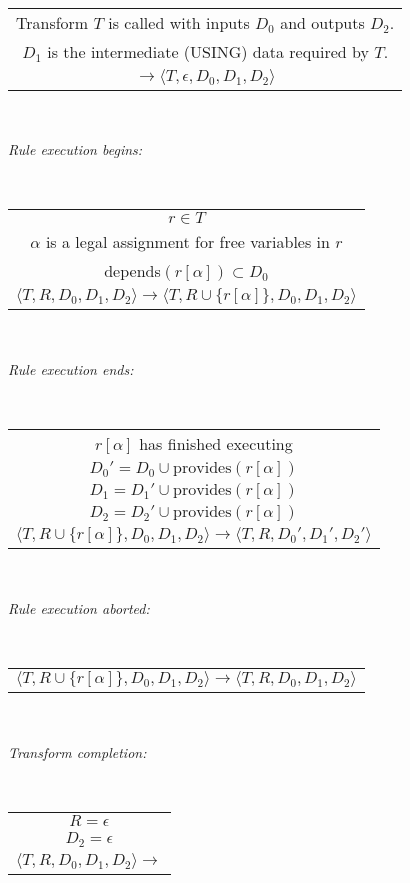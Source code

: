 \documentclass[11pt]{article}
\begin{document}
~

\begin{tabular}{c}
Transform $T$ is called with inputs $D_0$ and outputs $D_2$.
\\
$D_1$ is the intermediate (USING) data required by $T$.
\\\hline
$\rightarrow \langle T, \epsilon, D_0, D_1, D_2 \rangle$ 
\end{tabular}

~

\noindent
{\it
Rule execution begins:}

~

\begin{tabular}{c}
$r \in T$ \\
$\alpha$ is a legal assignment for free variables in $r$ \\
depends$(r[\alpha]) \subset D_0$  
\\\hline
$
\langle T, R, D_0, D_1, D_2 \rangle
\rightarrow
\langle T, R \cup \{r[\alpha]\}, D_0, D_1, D_2 \rangle$ 
\end{tabular}

~

\noindent
{\it
Rule execution ends:}

~

\begin{tabular}{c}
$r[\alpha]$ has finished executing
\\
$D_0' = D_0 \cup {\mbox{provides}(r[\alpha])}$
\\
$D_1 = D_1' \cup {\mbox{provides}(r[\alpha])}$
\\
$D_2 = D_2' \cup {\mbox{provides}(r[\alpha])}$
\\\hline
$
\langle T, R \cup \{r[\alpha]\}, D_0, D_1, D_2 \rangle
\rightarrow
\langle T, R, D_0', D_1', D_2' \rangle$
\end{tabular}

~

\noindent
{\it
Rule execution aborted:}

~

\begin{tabular}{c}
$
\langle T, R \cup \{r[\alpha]\}, D_0, D_1, D_2 \rangle
\rightarrow
\langle T, R, D_0, D_1, D_2 \rangle$
\end{tabular}


~

\noindent
{\it
Transform completion:}

~

\begin{tabular}{c}
$R=\epsilon$
\\
$D_2=\epsilon$
\\\hline
$
\langle T, R, D_0, D_1, D_2 \rangle
\rightarrow$
\end{tabular}
\end{document}
